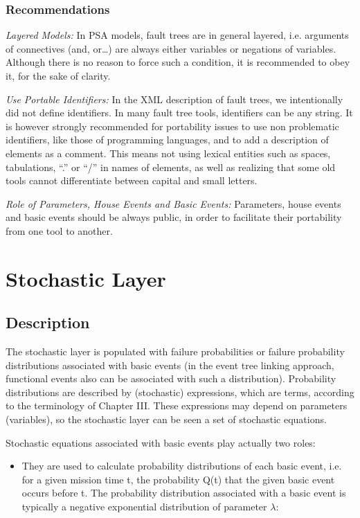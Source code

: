 \documentclass[11pt]{article}
\begin{document}
\subsubsection{Recommendations}
\label{sec:orgae35188}

\emph{Layered Models:} In PSA models, fault trees are in general layered,
i.e. arguments of connectives (and, or\ldots{}) are always either variables
or negations of variables. Although there is no reason to force such a
condition, it is recommended to obey it, for the sake of clarity.

\emph{Use Portable Identifiers:} In the XML description of fault trees, we
intentionally did not define identifiers. In many fault tree tools,
identifiers can be any string. It is however strongly recommended for
portability issues to use non problematic identifiers, like those of
programming languages, and to add a description of elements as a
comment. This means not using lexical entities such as spaces,
tabulations, ``.'' or ``/'' in names of elements, as well as realizing that
some old tools cannot differentiate between capital and small letters.

\emph{Role of Parameters, House Events and Basic Events:} Parameters, house
events and basic events should be always public, in order to facilitate
their portability from one tool to another.

\section{Stochastic Layer}
\label{sec:orgf2bd65d}

\subsection{Description}
\label{sec:orgb184d78}

The stochastic layer is populated with failure probabilities or failure
probability distributions associated with basic events (in the event
tree linking approach, functional events also can be associated with
such a distribution). Probability distributions are described by
(stochastic) expressions, which are terms, according to the terminology
of Chapter III. These expressions may depend on parameters (variables),
so the stochastic layer can be seen a set of stochastic equations.

Stochastic equations associated with basic events play actually two
roles:

\begin{itemize}
\item They are used to calculate probability distributions of each basic
event, i.e. for a given mission time t, the probability Q(t) that the
given basic event occurs before t. The probability distribution
associated with a basic event is typically a negative exponential
distribution of parameter \(\lambda\):
\end{itemize}
\end{document}
